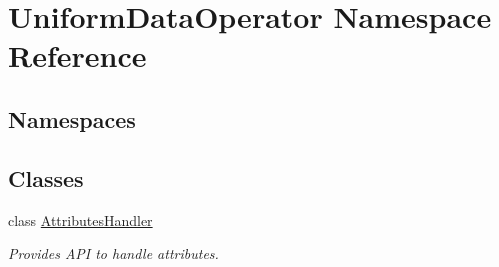 \hypertarget{namespace_uniform_data_operator}{}\section{Uniform\+Data\+Operator Namespace Reference}
\label{namespace_uniform_data_operator}
\subsection*{Namespaces}
\begin{DoxyCompactItemize}
\end{DoxyCompactItemize}
\subsection*{Classes}
\begin{DoxyCompactItemize}
\item 
class \mbox{\hyperlink{class_uniform_data_operator_1_1_attributes_handler}{Attributes\+Handler}}
\begin{DoxyCompactList}\small\item\em Provides A\+PI to handle attributes. \end{DoxyCompactList}\end{DoxyCompactItemize}
